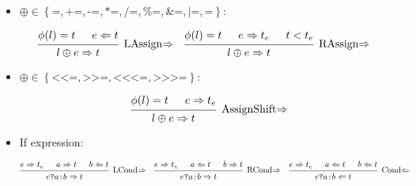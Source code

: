 \documentclass{article}
\newcommand{\assignBinOp}{\ensuremath{\left\{
      \texttt{=}, \texttt{+=}, \texttt{-=}, \texttt{*=}, \texttt{/=},
      \texttt{\%=}, \texttt{\&=}, \texttt{|=}, \texttt{\^{}=}
    \right\}}}
\newcommand{\assignShift}{\ensuremath{\left\{
      \texttt{<}\texttt{<=}, \texttt{>>=},
      \texttt{<}\texttt{<}\texttt{<=}, \texttt{>>>=}
    \right\}}}
\renewcommand{\S}{\ensuremath{\Rightarrow}}
\newcommand{\C}{\ensuremath{\Leftarrow}}
\newcommand{\s}[2]{#1 \S{} #2}
\renewcommand{\c}[2]{#1 \C{} #2}
\begin{document}
\begin{itemize}[leftmargin=*]
    \item $\oplus \in \assignBinOp$:

          \begin{align*}
               &
              \begin{prooftree}
                  \hypo{\phi(l) = t}
                  \hypo{\c{e}{t}}
                  \infer2[LAssign\S]{\s{l \oplus e}{t}}
              \end{prooftree}
               &
               &
              \begin{prooftree}
                  \hypo{\phi(l) = t}
                  \hypo{\s{e}{t_e}}
                  \hypo{t < t_e}
                  \infer3[RAssign\S]{\s{l \oplus e}{t}}
              \end{prooftree}
          \end{align*}


    \item $\oplus \in \assignShift$:

          \begin{equation*}
              \begin{prooftree}
                  \hypo{\phi(l) = t}
                  \hypo{\s{e}{t_e}}
                  \infer2[AssignShift\S]{\s{l \oplus e}{t}}
              \end{prooftree}
          \end{equation*}


    \item If expression:

          \begin{align*}
               &
              \begin{prooftree}
                  \hypo{\s{e}{t_e}}
                  \hypo{\s{a}{t}}
                  \hypo{\c{b}{t}}
                  \infer3[LCond\S]{\s{e \texttt{?} a \texttt{:} b}{t}}
              \end{prooftree}
               &
               &
              \begin{prooftree}
                  \hypo{\s{e}{t_e}}
                  \hypo{\c{a}{t}}
                  \hypo{\s{b}{t}}
                  \infer3[RCond\S]{\s{e \texttt{?} a \texttt{:} b}{t}}
              \end{prooftree}
               &
               &
              \begin{prooftree}
                  \hypo{\s{e}{t_e}}
                  \hypo{\c{a}{t}}
                  \hypo{\c{b}{t}}
                  \infer3[Cond\C]{\c{e \texttt{?} a \texttt{:} b}{t}}
              \end{prooftree}
          \end{align*}



\end{itemize}
\end{document}
